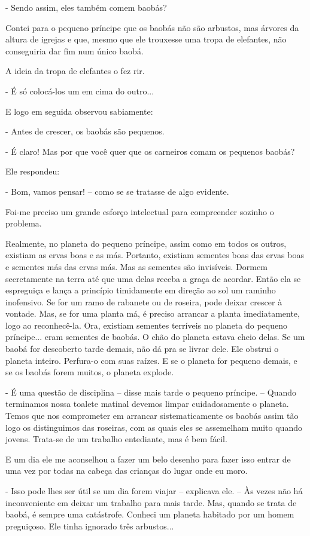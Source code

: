 - Sendo assim, eles também comem baobás?

Contei para o pequeno príncipe que os baobás não são arbustos, mas
árvores da altura de igrejas e que, mesmo que ele trouxesse uma tropa de
elefantes, não conseguiria dar fim num único baobá.

A ideia da tropa de elefantes o fez rir.

- É só colocá-los um em cima do outro...

E logo em seguida observou sabiamente:

- Antes de crescer, os baobás são pequenos.

- É claro! Mas por que você quer que os carneiros comam os pequenos
baobás?

Ele respondeu:

- Bom, vamos pensar! -- como se se tratasse de algo evidente.

Foi-me preciso um grande esforço intelectual para compreender sozinho o
problema.

Realmente, no planeta do pequeno príncipe, assim como em todos os
outros, existiam as ervas boas e as más. Portanto, existiam sementes
boas das ervas boas e sementes más das ervas más. Mas as sementes são
invisíveis. Dormem secretamente na terra até que uma delas receba a
graça de acordar. Então ela se espreguiça e lança a princípio
timidamente em direção ao sol um raminho inofensivo. Se for um ramo de
rabanete ou de roseira, pode deixar crescer à vontade. Mas, se for uma
planta má, é preciso arrancar a planta imediatamente, logo ao
reconhecê-la. Ora, existiam sementes terríveis no planeta do pequeno
príncipe... eram sementes de baobás. O chão do planeta estava cheio
delas. Se um baobá for descoberto tarde demais, não dá pra se livrar
dele. Ele obstrui o planeta inteiro. Perfura-o com suas raízes. E se o
planeta for pequeno demais, e se os baobás forem muitos, o planeta
explode.

- É uma questão de disciplina -- disse mais tarde o pequeno príncipe. --
Quando terminamos nossa toalete matinal devemos limpar cuidadosamente o
planeta. Temos que nos comprometer em arrancar sistematicamente os
baobás assim tão logo os distinguimos das roseiras, com as quais eles se
assemelham muito quando jovens. Trata-se de um trabalho entediante, mas
é bem fácil.

E um dia ele me aconselhou a fazer um belo desenho para fazer isso
entrar de uma vez por todas na cabeça das crianças do lugar onde eu
moro.

- Isso pode lhes ser útil se um dia forem viajar -- explicava ele. -- Às
vezes não há inconveniente em deixar um trabalho para mais tarde. Mas,
quando se trata de baobá, é sempre uma catástrofe. Conheci um planeta
habitado por um homem preguiçoso. Ele tinha ignorado três arbustos...

